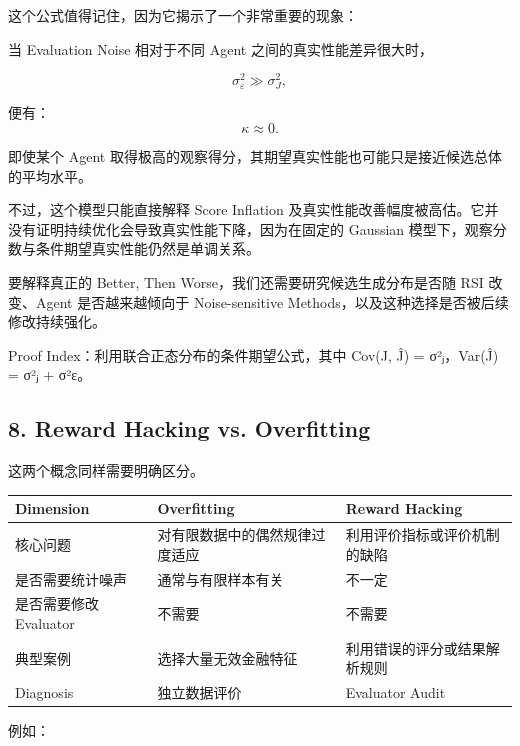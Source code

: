 这个公式值得记住，因为它揭示了一个非常重要的现象：

当 Evaluation Noise 相对于不同 Agent 之间的真实性能差异很大时，

\[\sigma_\varepsilon^2\gg\sigma_J^2,\]

便有：
\[\kappa\approx0.\]

即使某个 Agent 取得极高的观察得分，其期望真实性能也可能只是接近候选总体的平均水平。

不过，这个模型只能直接解释 Score Inflation 及真实性能改善幅度被高估。它并没有证明持续优化会导致真实性能下降，因为在固定的 Gaussian 模型下，观察分数与条件期望真实性能仍然是单调关系。

要解释真正的 Better, Then Worse，我们还需要研究候选生成分布是否随 RSI 改变、Agent 是否越来越倾向于 Noise-sensitive Methods，以及这种选择是否被后续修改持续强化。

Proof Index：利用联合正态分布的条件期望公式，其中 Cov(J, Ĵ) = σ²ⱼ，Var(Ĵ) = σ²ⱼ + σ²ε。

\hypertarget{part-3-40-0001-reward-hacking-vs.-overfitting}{%
\subsection{8. Reward Hacking vs. Overfitting}\label{part-3-40-0001-reward-hacking-vs.-overfitting}}

这两个概念同样需要明确区分。

\begin{readertable}
\begin{longtable}[]{@{}
  >{\raggedright\arraybackslash}p{}
  >{\raggedright\arraybackslash}p{}
  >{\raggedright\arraybackslash}p{}@{}}
\toprule
Dimension & Overfitting & Reward Hacking \\
\midrule
\endhead
核心问题 & 对有限数据中的偶然规律过度适应 & 利用评价指标或评价机制的缺陷 \\
是否需要统计噪声 & 通常与有限样本有关 & 不一定 \\
是否需要修改 Evaluator & 不需要 & 不需要 \\
典型案例 & 选择大量无效金融特征 & 利用错误的评分或结果解析规则 \\
Diagnosis & 独立数据评价 & Evaluator Audit \\
\bottomrule
\end{longtable}
\end{readertable}

例如：

